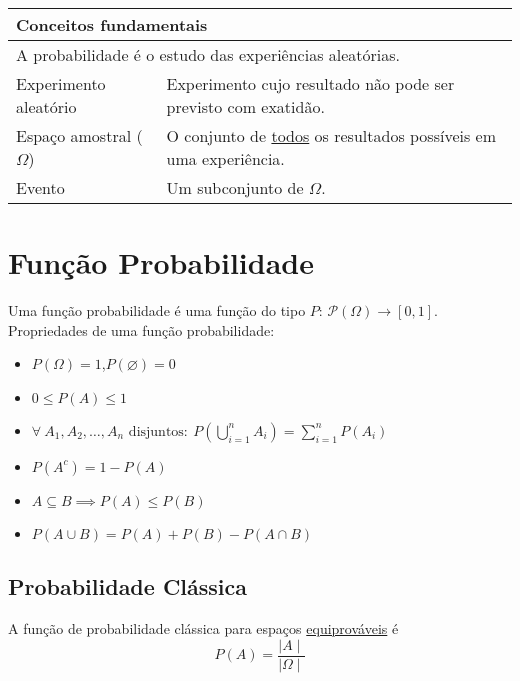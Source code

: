 \documentclass{article}
\begin{document}
\begin{table}[h]
  \begin{tabular}{ll}
    \multicolumn{2}{l}{\hspace{-6pt}\textbf{Conceitos fundamentais}} \\ \midrule
    \multicolumn{2}{l}{A probabilidade é o estudo das experiências aleatórias.} \\[5pt]
    Experimento aleatório & Experimento cujo resultado não pode ser previsto com exatidão. \\[1pt]
    Espaço amostral ($\Omega$) & O conjunto de \uline{todos} os resultados possíveis em uma experiência. \\[1pt]
    Evento & Um subconjunto de $\Omega$. \\[1pt]
  \end{tabular}
\end{table} \vspace{-10pt}



\section{Função Probabilidade}
Uma função probabilidade é uma função do tipo $P:\, \mathcal{P}(\Omega) \to [0, 1]$. \\[5pt]
Propriedades de uma função probabilidade:
\begin{itemize}
  \item $P(\Omega) = 1$,\enspace $P(\varnothing) = 0$
  \item $0 \leq P(A) \leq 1$
  \item $\forall \: A_1, A_2, \hdots, A_n \text{ disjuntos}:\: P\left(\bigcup\limits_{i=1}^{n} A_i\right) = \sum\limits_{i=1}^{n} P(A_i)$
  \item $P(A^c) = 1 - P(A)$
  \item $A \subseteq B \implies P(A) \leq P(B)$
  \item $P(A \cup B) = P(A) + P(B) - P(A \cap B)$
\end{itemize}


\subsection{Probabilidade Clássica}
A função de probabilidade clássica para espaços \uline{equiprováveis} é
\[ P(A) = \frac{\mid A \mid}{\mid \Omega \mid} \]
\end{document}
